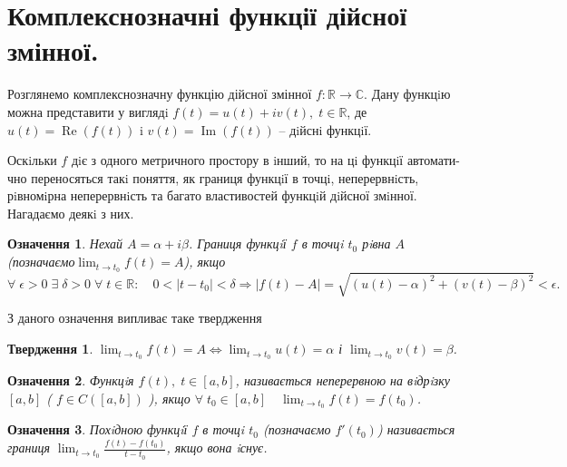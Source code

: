 \documentclass[10pt]{report} %
\renewcommand\Re{\operatorname{Re}}
\renewcommand\Im{\operatorname{Im}}
\let\oldlim\lim
\renewcommand{\lim}{\displaystyle\oldlim}
\let\oldforall\forall
\renewcommand{\forall}{\oldforall\;}
\let\oldexists\exists
\renewcommand{\exists}{\oldexists\;}
\newtheorem{definition}{Означення}[section]
\newtheorem{proposition}{Твердження}[section]
\begin{document}
\section{Комплекснозначні функції дійсної змінної.}
Розглянемо комплекснозначну функцію дійсної змінної $f:\mathbb{R}\to\mathbb{C}$. Дану функцiю можна представити у виглядi $f(t) = u(t) + iv(t),\; t \in \mathbb{R}$, де $u(t) = \Re(f(t))$ i $v(t) =
\Im(f(t))$ – дiйснi функцiї.
	
Оскiльки $f$ дiє з одного метричного простору в iнший, то на цi функцiї автомати-
чно переносяться такi поняття, як границя функцiї в точцi, неперервнiсть, рiвномiрна
неперервнiсть та багато властивостей функцiй дiйсної змiнної. Нагадаємо деякi з них.

\begin{definition}
	Нехай $A = \alpha + i\beta$. Границя функцiї $f$ в точцi $t_0$ рiвна $A$ (позначаємо$\lim_{t\to t_0} f (t) = A$), якщо
	\[\forall \epsilon>0 \;\exists \delta>0\;\forall t\in\mathbb{R}:\quad 0<|t-t_0|<\delta\Rightarrow |f(t)-A|=\sqrt{{(u(t)-\alpha)}^2+
	{(v(t)-\beta)}^2}<\epsilon.\]
\end{definition}

З даного означення випливає таке твердження
\begin{proposition}$\lim_{t\to t_0} f(t)=A\Leftrightarrow \lim_{t\to t_0} u(t)=\alpha$ і $\lim_{t\to t_0}v(t)=\beta$.
\end{proposition}
\begin{definition}
Функцiя $f(t),\;t \in [a, b]$, називається неперервною на вiдрiзку $[a, b]$
( $f \in C([a, b])$ ), якщо $\forall t_0 \in [a, b]\quad \lim_{t\to t_0} f(t) = f(t_0)$.
\end{definition}
\begin{definition}
Похiдною функцiї $f$ в точцi $t_0$ (позначаємо $f' (t_0 )$) називається границя $\lim_{t\to t_0}\frac{f (t)-f (t_0 )}{t-t_0}$, якщо вона iснує.
\end{definition}
\end{document}

